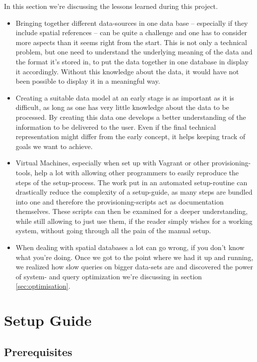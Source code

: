 \documentclass[paper=a4, fontsize=11pt]{article} %
\numberwithin{equation}{section} %
\numberwithin{figure}{section} %
\numberwithin{table}{section} %
\begin{document}
In this section we're discussing the lessons learned during this project.
\begin{itemize}
\item Bringing together different data-sources in one data base -- especially if they include spatial references -- can be quite a challenge and one has to consider more aspects than it seems right from the start. This is not only a technical problem, but one need to understand the underlying meaning of the data and the format it's stored in, to put the data together in one database in display it accordingly. Without this knowledge about the data, it would have not been possible to display it in a meaningful way.
\item Creating a suitable data model at an early stage is as important as it is difficult, as long as one has very little knowledge about the data to be processed. By creating this data one develops a better understanding of the information to be delivered to the user. Even if the final technical representation might differ from the early concept, it helps keeping track of goals we want to achieve.
\item Virtual Machines, especially when set up with Vagrant or other provisioning-tools, help a lot with allowing other programmers to easily reproduce the steps of the setup-process. The work put in an automated setup-routine can drastically reduce the complexity of a setup-guide, as many steps are bundled into one and therefore the provisioning-scripts act as documentation themselves. These scripts can then be examined for a deeper understanding, while still allowing to just use them, if the reader simply wishes for a working system, without going through all the pain of the manual setup.
\item When dealing with spatial databases a lot can go wrong, if you don't know what you're doing. Once we got to the point where we had it up and running, we realized how slow queries on bigger data-sets are and discovered the power of system- and query optimization we're discussing in section \ref{sec:optimisation}.

\end{itemize}


\section{Setup Guide}
\subsection{Prerequisites}
\end{document}
